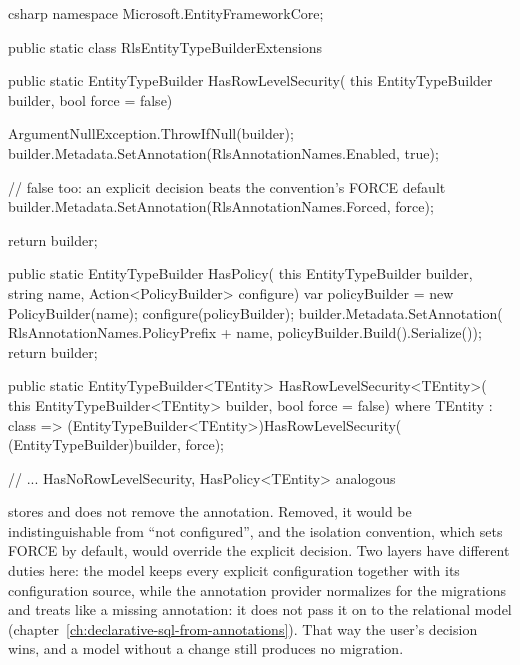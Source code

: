 \begin{sourcecode}{csharp}
namespace Microsoft.EntityFrameworkCore;

public static class RlsEntityTypeBuilderExtensions
{
    public static EntityTypeBuilder HasRowLevelSecurity(
        this EntityTypeBuilder builder, bool force = false)
    {
        ArgumentNullException.ThrowIfNull(builder);
        builder.Metadata.SetAnnotation(RlsAnnotationNames.Enabled, true);

        // false too: an explicit decision beats the convention's FORCE default
        builder.Metadata.SetAnnotation(RlsAnnotationNames.Forced, force);

        return builder;
    }

    public static EntityTypeBuilder HasPolicy(
        this EntityTypeBuilder builder, string name, Action<PolicyBuilder> configure)
    {
        var policyBuilder = new PolicyBuilder(name);
        configure(policyBuilder);
        builder.Metadata.SetAnnotation(
            RlsAnnotationNames.PolicyPrefix + name, policyBuilder.Build().Serialize());
        return builder;
    }

    public static EntityTypeBuilder<TEntity> HasRowLevelSecurity<TEntity>(
        this EntityTypeBuilder<TEntity> builder, bool force = false) where TEntity : class
        => (EntityTypeBuilder<TEntity>)HasRowLevelSecurity(
            (EntityTypeBuilder)builder, force);

    // ... HasNoRowLevelSecurity, HasPolicy<TEntity> analogous
}
\end{sourcecode}

stores  and does not remove the annotation. Removed, it would be indistinguishable
from “not configured”, and the isolation convention, which sets FORCE by default, would override
the explicit decision. Two layers have different duties here: the model keeps every explicit
configuration together with its configuration source, while the annotation provider normalizes
for the migrations and treats  like a missing annotation: it does not pass it on to
the relational model (chapter~\ref{ch:declarative-sql-from-annotations}). That way the user's decision wins, and a
model without a change still produces no migration.

